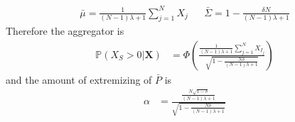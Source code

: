\documentclass[11pt]{article}
\renewcommand{\P}{\mathbb{P}}
\theoremstyle{definition}
\theoremstyle{definition}
\begin{document}
\begin{align*}
\bar{\mu} = \frac{1}{(N-1)\lambda +1}  \sum_{j=1}^N X_j 
&&  \bar{\Sigma} = 1  - \frac{\delta N}{(N-1)\lambda +1} 
\end{align*}
Therefore the  aggregator is
\begin{align}
\P\left(X_S > 0 | \boldsymbol{X}\right) &=\Phi\left(\frac{\frac{1}{(N-1)\lambda +1} \sum_{j=1}^N X_{I_j} }{\sqrt{1- \frac{N\delta}{(N-1)\lambda +1} }}  \right) \label{CompoundAggre}
\end{align}
and the amount of extremizing of $\bar{P}$ is
\begin{align}
\alpha &= \frac{\frac{N\sqrt{1-\delta}}{(N-1)\lambda +1}}{\sqrt{1- \frac{N\delta}{(N-1)\lambda +1} }} \label{CompoundAlpha}
\end{align}
\end{document}
